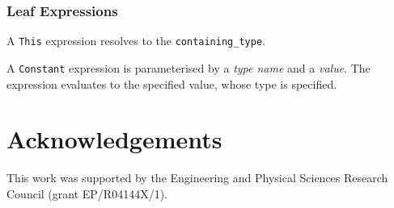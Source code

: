 \documentclass[10pt,twocolumn,a4paper]{article}
\newcommand{\code}[1]{\texttt{#1}}
\begin{document}
\subsubsection{Leaf Expressions}

A \code{This} expression resolves to the \code{containing\_type}.

A \code{Constant} expression is parameterised by a \emph{type name} and a \emph{value}. 
The expression evaluates to the specified value, whose type is specified.

\section{Acknowledgements}

This work was supported by the Engineering and Physical Sciences Research
Council (grant EP/R04144X/1).



\ifpdf
  \ifdefined\pdftrailerid
    \pdftrailerid{}
  \fi
\fi
\end{document}
